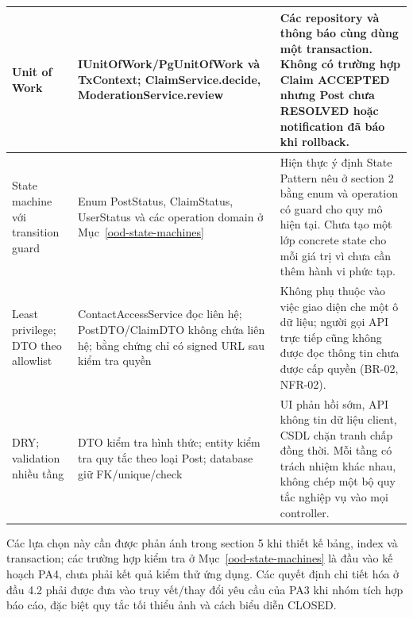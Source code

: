 \begin{longtable}{|>{\raggedright\arraybackslash}p{.22\linewidth}|>{\raggedright\arraybackslash}p{.32\linewidth}|>{\raggedright\arraybackslash}p{.39\linewidth}|}
Unit of Work & IUnitOfWork/PgUnitOfWork và TxContext; ClaimService.decide, ModerationService.review & Các repository và thông báo cùng dùng một transaction. Không có trường hợp Claim ACCEPTED nhưng Post chưa RESOLVED hoặc notification đã báo khi rollback. \\ \hline
State machine với transition guard & Enum PostStatus, ClaimStatus, UserStatus và các operation domain ở Mục~\ref{ood-state-machines} & Hiện thực ý định State Pattern nêu ở section 2 bằng enum và operation có guard cho quy mô hiện tại. Chưa tạo một lớp concrete state cho mỗi giá trị vì chưa cần thêm hành vi phức tạp. \\ \hline
Least privilege; DTO theo allowlist & ContactAccessService đọc liên hệ; PostDTO/ClaimDTO không chứa liên hệ; bằng chứng chỉ có signed URL sau kiểm tra quyền & Không phụ thuộc vào việc giao diện che một ô dữ liệu; người gọi API trực tiếp cũng không được đọc thông tin chưa được cấp quyền (BR-02, NFR-02). \\ \hline
DRY; validation nhiều tầng & DTO kiểm tra hình thức; entity kiểm tra quy tắc theo loại Post; database giữ FK/unique/check & UI phản hồi sớm, API không tin dữ liệu client, CSDL chặn tranh chấp đồng thời. Mỗi tầng có trách nhiệm khác nhau, không chép một bộ quy tắc nghiệp vụ vào mọi controller. \\ \hline
\end{longtable}

Các lựa chọn này cần được phản ánh trong section 5 khi thiết kế bảng, index và transaction; các trường hợp kiểm tra ở Mục~\ref{ood-state-machines} là đầu vào kế hoạch PA4, chưa phải kết quả kiểm thử ứng dụng. Các quyết định chi tiết hóa ở đầu 4.2 phải được đưa vào truy vết/thay đổi yêu cầu của PA3 khi nhóm tích hợp báo cáo, đặc biệt quy tắc tối thiểu ảnh và cách biểu diễn CLOSED.

